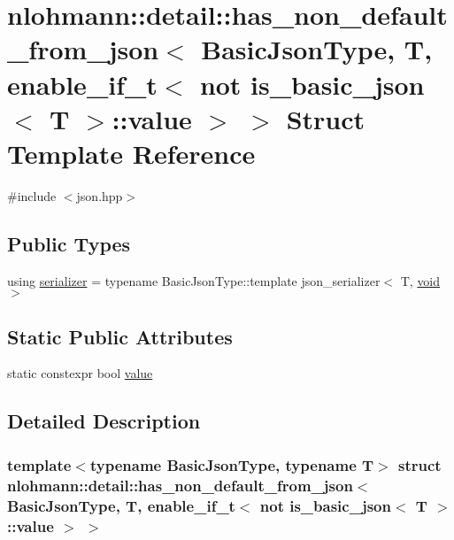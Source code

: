 \hypertarget{structnlohmann_1_1detail_1_1has__non__default__from__json_3_01_basic_json_type_00_01_t_00_01enab81bd4c814ac1146ff15f3f4636933207}{}\section{nlohmann\+::detail\+::has\+\_\+non\+\_\+default\+\_\+from\+\_\+json$<$ Basic\+Json\+Type, T, enable\+\_\+if\+\_\+t$<$ not is\+\_\+basic\+\_\+json$<$ T $>$\+::value $>$ $>$ Struct Template Reference}
\label{structnlohmann_1_1detail_1_1has__non__default__from__json_3_01_basic_json_type_00_01_t_00_01enab81bd4c814ac1146ff15f3f4636933207}


{\ttfamily \#include $<$json.\+hpp$>$}

\subsection*{Public Types}
\begin{DoxyCompactItemize}
\item 
using \mbox{\hyperlink{structnlohmann_1_1detail_1_1has__non__default__from__json_3_01_basic_json_type_00_01_t_00_01enab81bd4c814ac1146ff15f3f4636933207_a610272ed924122e0c46d158ecdfe6faf}{serializer}} = typename Basic\+Json\+Type\+::template json\+\_\+serializer$<$ T, \mbox{\hyperlink{namespacenlohmann_1_1detail_a59fca69799f6b9e366710cb9043aa77d}{void}} $>$
\end{DoxyCompactItemize}
\subsection*{Static Public Attributes}
\begin{DoxyCompactItemize}
\item 
static constexpr bool \mbox{\hyperlink{structnlohmann_1_1detail_1_1has__non__default__from__json_3_01_basic_json_type_00_01_t_00_01enab81bd4c814ac1146ff15f3f4636933207_a1494ac5fed1163aab4a89208ff04ee85}{value}}
\end{DoxyCompactItemize}


\subsection{Detailed Description}
\subsubsection*{template$<$typename Basic\+Json\+Type, typename T$>$\newline
struct nlohmann\+::detail\+::has\+\_\+non\+\_\+default\+\_\+from\+\_\+json$<$ Basic\+Json\+Type, T, enable\+\_\+if\+\_\+t$<$ not is\+\_\+basic\+\_\+json$<$ T $>$\+::value $>$ $>$}




